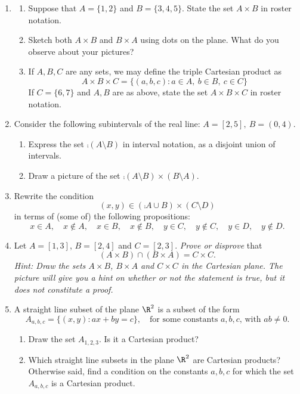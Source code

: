 \begin{enumerate}\renewcommand{\labelenumi}{\thesubsection.\theenumi}
  \item\begin{enumerate}
    \item Suppose that $A=\{1,2\}$ and $B=\{3,4,5\}$. State the set $A\times B$ in roster notation.
    \item Sketch both $A\times B$ and $B\times A$ using dots on the plane. What do you observe about your pictures?
    \item If $A,B,C$ are any sets, we may define the triple Cartesian product as
    \[A\times B\times C=\big\{(a,b,c):a\in A,\ b\in B,\ c\in C\big\}\]
    If $C=\{6,7\}$ and $A,B$ are as above, state the set $A\times B\times C$ in roster notation.
  \end{enumerate}
  
  \item Consider the following subintervals of the real line: $A=[2,5],\ B=(0,4)$.
  \begin{enumerate}
    \item Express the set $\comp{(A\setminus B)}$ in interval notation, as a disjoint union of intervals.
    \item Draw a picture of the set $\comp{(A\setminus B)}\times (B\setminus A)$.
  \end{enumerate}

	\item Rewrite the condition
	\[(x,y)\in (\comp{A}\cup B)\times (C\setminus D)\]
	in terms of (some of) the following propositions:
	\[x\in A,\quad x\not\in A,\quad x\in B,\quad x\not\in B,\quad y\in C,\quad y\not\in C,\quad y\in D,\quad y\not\in D.\]

	\item Let $A=[1,3]$, $B=[2,4]$ and $C=[2,3]$. \emph{Prove or disprove} that
	\[(A\times B)\cap (B\times A)=C\times C.\]
	\emph{Hint: Draw the sets $A\times B$, $B\times A$ and $C\times C$ in the Cartesian plane. The picture will give you a hint on whether or not the statement is true, but it does not constitute a proof.}
	
	\item A straight line subset of the plane $\R^2$ is a subset of the form
	  \[A_{a,b,c}=\{(x,y):ax+by=c\},\quad\text{for some constants $a,b,c$, with $ab\neq 0$.}\]
	  \begin{enumerate}
	  \item Draw the set $A_{1,2,3}$. Is it a Cartesian product?
	 	\item Which straight line subsets in the plane $\R^2$ are Cartesian products? Otherwise said, find a condition on the constants $a,b,c$ for which the set $A_{a,b,c}$ is a Cartesian product.
		\end{enumerate}
	

\end{enumerate}
